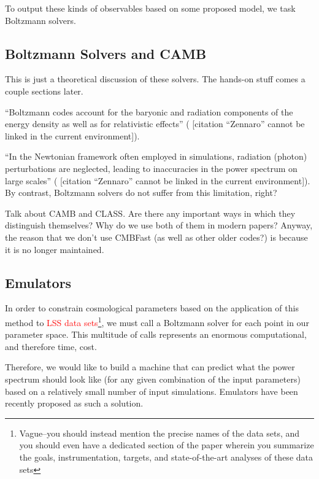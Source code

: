 \documentclass[11pt]{article}
\newcommand{\cbib}[1]
{\IfFileExists{biblatex.sty}
{\cite{#1}}
{[citation ``#1'' cannot be linked in the current environment]}}
\begin{document}
To output these kinds of observables based on some proposed model, we task
Boltzmann solvers.

\begin{centering}
\section{Boltzmann Solvers and CAMB}
\end{centering}

This is just a theoretical discussion of these solvers. The hands-on stuff
comes a couple sections later.

``Boltzmann codes account for the baryonic and radiation components of the
energy density as well as for relativistic effects'' (\cbib{Zennaro}).

``In the Newtonian framework often employed in simulations, radiation (photon)
perturbations are neglected, leading to inaccuracies in the power spectrum on
large scales'' (\cbib{Zennaro}). By contrast, Boltzmann solvers do not suffer
from this limitation, right?

Talk about CAMB and CLASS. Are there any important ways in which they
distinguish themselves? Why do we use both of them in modern papers? Anyway,
the reason that we don't use CMBFast (as well as other older codes?) is
because it is no longer maintained.


\begin{centering}
\section{Emulators}
\end{centering}

In order to constrain cosmological parameters based on the application of this
method to \textcolor{red}{LSS data sets}\footnote{
	Vague--you should instead mention the precise names of the data sets,
	and you should even have a dedicated section of the paper wherein you
	summarize the goals, instrumentation, targets, and state-of-the-art
	analyses of these data sets
}, we must call a Boltzmann solver for each point in our parameter space. This
multitude of calls represents an enormous computational, and therefore time,
cost.

Therefore, we would like to build a machine that can predict what the power
spectrum should look like (for any given combination of the input parameters)
based on a relatively small number of input simulations. Emulators have been
recently proposed as such a solution.
\end{document}
